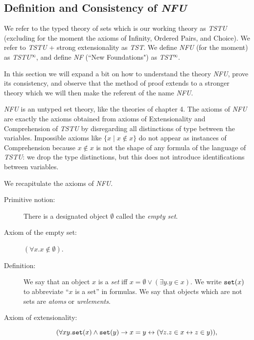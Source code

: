 \documentclass[12pt]{book}
\begin{document}
\subsection{Definition and Consistency of {\em NFU\/}}

We refer to the typed theory of sets which is our working theory as {\em TSTU\/} (excluding for the moment the axioms of Infinity, Ordered Pairs, and Choice).  We refer to
{\em TSTU\/} + strong extensionality as {\em TST\/}.  We define {\em NFU\/} (for the moment) as {\em TSTU$^{\infty}$\/}, and define {\em NF\/}  (``New Foundations") as {\em TST$^{\infty}$\/}.

In this section we will expand a bit on how to understand the theory {\em NFU\/}, prove its consistency, and observe that the method of proof extends to a stronger theory which we will then make the referent of the name {\em NFU\/}.

{\em NFU\/} is an untyped set theory, like the theories of chapter 4.  The axioms of {\em NFU\/} are exactly the axioms obtained from axioms of Extensionality and Comprehension of {\em TSTU\/} by disregarding all distinctions of type between the variables.
Impossible axioms like $\{x \mid x \not\in x\}$ do not appear as instances of Comprehension because $x \not\in x$ is not the shape of any formula of the language of {\em TSTU\/}:  we drop the type distinctions, but this does not introduce identifications between variables.

We recapitulate the axioms of {\em NFU\/}.

\begin{description}

\item[Primitive notion:] There is a designated object $\emptyset$ called the {\em empty set\/}.

\item[Axiom of the empty set:] $(\forall x.x\not\in \emptyset)$.

\item[Definition:] We say that an object $x$ is a
{\em set\/} iff $x = \emptyset \vee (\exists y.y \in x)$.  We write
${\tt set}(x)$ to abbreviate ``$x$ is a set'' in formulas.  We say
that objects which are not sets are {\em atoms} or {\em urelements\/}.

\item[Axiom of extensionality:] $$(\forall xy.{\tt set}(x) \wedge {\tt
set}(y) \rightarrow x=y\leftrightarrow (\forall z.z\in x
\leftrightarrow z\in y)),$$

\end{description}
\end{document}
